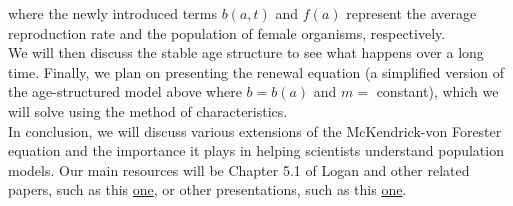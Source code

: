\documentclass[11pt]{article}
\begin{document}
where the newly introduced terms $b(a, t)$ and $f(a)$ represent the average reproduction rate and the population of female organisms, respectively. \\

We will then discuss the stable age structure to see what happens over a long time. Finally, we plan on presenting the renewal equation (a simplified version of the age-structured model above where $b = b(a)$ and $m =$ constant), which we will solve using the method of characteristics. \\

In conclusion, we will discuss various extensions of the McKendrick-von Forester equation and the importance it plays in helping scientists understand population models. Our main resources will be Chapter 5.1 of Logan and other related papers, such as this \href{https://pdf.sciencedirectassets.com/271552/1-s2.0-S0895717700X00556/1-s2.0-S0895717797001659/main.pdf?X-Amz-Security-Token=IQoJb3JpZ2luX2VjEFMaCXVzLWVhc3QtMSJGMEQCIHGjPP3QmYF7lUpMar3X0iPw%2BLTC6Mp4J%2B5V6wRAEs3IAiBW5y4AQyZbjSqaBTOsUVC%2FMm57XAwDj0s4ZweuzxmG7irVBAjc%2F%2F%2F%2F%2F%2F%2F%2F%2F%2F8BEAUaDDA1OTAwMzU0Njg2NSIMr81u3tAkt6yfEZHdKqkEv%2BahXl5OAN%2Bblv%2FtdKKEv6JHIHgd4OCYTCgbLaT%2BpPpYKkChw84iFXE%2Fb8g1ktet8mDHeZOg60OeQn%2BL0X5Co4sBo10210NMuKzpGVvHTu3xAvXlgmGPJzOuQeAMzvKPB2wwwvN8jFm9yYEX3JmdcPMklu3lJ4GfEcgJSqb0oFMKfvLumzYSxrIKozz3xDOF8JzRvSFebaucogQrroxIg3N1M0AxZVy4MztqQA%2BLfuWIG6DzYXHJRJNWJbNUc67u9rqUXMJXwk96OeeDQzlmjjwHPtdgChW4jj1aEWn5x%2BhDEQv3aubo3rsCP682tjUeDAZDpGn0RtZ5QR46474EM4I5FYADTpHkgWFd%2F2YU4OVcUQq26WzQ4XKZMZsNat9eoXbioErq9WRFoC3rNAu2rqOEygoi9NGZUPbb80hB06Caki546NxZmJ3gov%2FDGGXUEsuNol8K04CkZcpftvJccTinD3DxB3v7wp35%2B1OQCS99exlfA%2BstooihGByg0%2F1u4Yj5hirQ0qPIBd7ePGj15wYb7RRuAhiMz%2Fx2iy3%2BUz23brTyM%2Ft6FxWO%2FjJQ4BQKdcvzMYdggNPEiyNypKRXK%2BnWzQL5o20QY2J%2Bfv9ZVVB%2BAT2%2FaFtiM3qVClr81xo2SIEjsW9xVWCxhkOswvma5Z7rYSx4DJZ6i6hwYcVoCyjeftEeMjDQ7o%2FlSlJ2Kf%2FAfFZiXPrhrLL3a1AsxM47hj%2BSaPjYoqx7ZDDZ3aSfBjqqAbfsUaPb7RmlHKItHZmDsZHDCysfih1ZAYGPieeZqyOhMwr1MnPPkbL1%2FWompvEt2QJiJnBSAo6qiyIeVF3MB%2FWhyoEHNUrYb80D5zyeBTsgrz7yHGfu7yGCeeidMV3oDAga0teMt3dJ1BR0NUrRG8r4KD%2F5zk5gi7yJs05VpFQwJTsVYLhlftP5qomVT2M4e7%2B1LVZsMNqzO8JrgBAnJsPwXc1xHw1UVH19&X-Amz-Algorithm=AWS4-HMAC-SHA256&X-Amz-Date=20230212T191601Z&X-Amz-SignedHeaders=host&X-Amz-Expires=300&X-Amz-Credential=ASIAQ3PHCVTYXJCA3JUT%2F20230212%2Fus-east-1%2Fs3%2Faws4_request&X-Amz-Signature=79be86eab77e3a5c0e64838e374d887d34b5c382c680961427e0ac4e1b8acb26&hash=8b1c8527e1ef0c5108cb085d71704f32d6f1e104d4c230540ce33e89da7f6a49&host=68042c943591013ac2b2430a89b270f6af2c76d8dfd086a07176afe7c76c2c61&pii=S0895717797001659&tid=spdf-1c2a0f02-f363-44a7-b414-315d2a5071ca&sid=5ab4ad84655bd84f5a282503effe58bea59fgxrqa&type=client&tsoh=d3d3LnNjaWVuY2VkaXJlY3QuY29t&ua=0f16505856500258515100&rr=7987a806ddd88cca&cc=us}{one}, or other presentations, such as this \href{https://jmahaffy.sdsu.edu/courses/f17/math636/beamer/ageblood.pdf}{one}.
\end{document}
